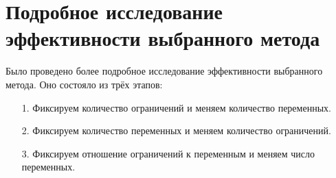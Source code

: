 \documentclass[a4paper,14pt,russian]{extreport}
\begin{document}
\section{Подробное исследование эффективности выбранного метода}
Было проведено более подробное исследование эффективности выбранного метода. Оно состояло из трёх этапов:
\begin{enumerate}
\item[1.] Фиксируем количество ограничений и меняем количество переменных.
\item[2.] Фиксируем количество переменных и меняем количество ограничений.
\item[3.] Фиксируем отношение ограничений к переменным и меняем число переменных. 
\end{enumerate}
\par
\end{document}
